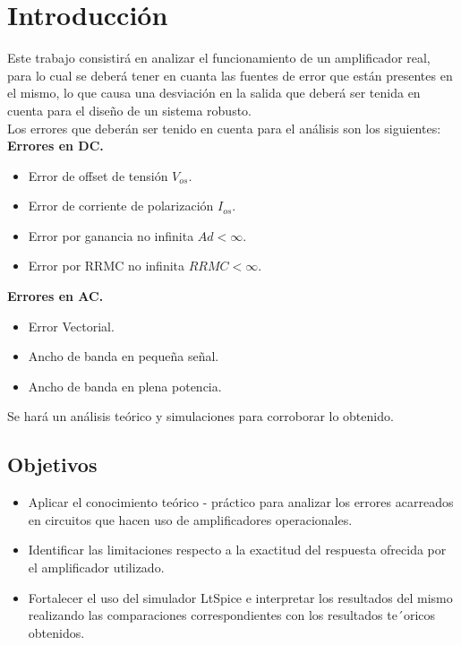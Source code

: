 \section{Introducción}

Este trabajo consistirá en analizar el funcionamiento de un amplificador real, para lo cual se deberá tener en cuanta las fuentes de error que están presentes en el mismo, lo que causa una desviación en la salida que deberá ser tenida en cuenta para el diseño de un sistema robusto.\\

Los errores que deberán ser tenido en cuenta para el análisis son los siguientes:\\

\textbf{Errores en DC.}
\begin{itemize}
    \item Error de offset de tensión $V_{os}$.\\
    \item Error de corriente de polarización $I_{os}$.\\
    \item Error por ganancia no infinita $Ad < \infty$.\\
    \item Error por RRMC no infinita $RRMC < \infty$.\\
\end{itemize}

\textbf{Errores en AC.}
\begin{itemize}
    \item Error Vectorial.\\
    \item Ancho de banda en pequeña señal.\\
    \item Ancho de banda en plena potencia.\\
\end{itemize}

Se hará un análisis teórico y simulaciones para corroborar lo obtenido.


\subsection{Objetivos}
    \begin{itemize}
        \item Aplicar el conocimiento teórico - práctico para analizar los errores acarreados en circuitos que hacen uso de amplificadores operacionales.\\
        \item Identificar las limitaciones respecto a la exactitud del respuesta ofrecida por el amplificador utilizado.\\
        \item Fortalecer el uso del simulador LtSpice e interpretar los resultados del mismo realizando las comparaciones correspondientes con los resultados te´oricos obtenidos.\\
    \end{itemize}

